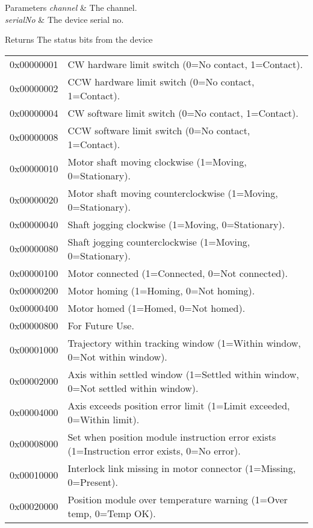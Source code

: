 \begin{DoxyParams}{Parameters}
{\em channel} & The channel. \\
\hline
{\em serial\+No} & The device serial no. \\
\hline
\end{DoxyParams}
\begin{DoxyReturn}{Returns}
The status bits from the device \tabulinesep=1mm
\begin{longtabu} spread 0pt [c]{*2{|X[-1]}|}
\hline
0x00000001&CW hardware limit switch (0=No contact, 1=Contact). \\
0x00000002&C\+CW hardware limit switch (0=No contact, 1=Contact). \\
0x00000004&CW software limit switch (0=No contact, 1=Contact). \\
0x00000008&C\+CW software limit switch (0=No contact, 1=Contact). \\
0x00000010&Motor shaft moving clockwise (1=Moving, 0=Stationary). \\
0x00000020&Motor shaft moving counterclockwise (1=Moving, 0=Stationary). \\
0x00000040&Shaft jogging clockwise (1=Moving, 0=Stationary). \\
0x00000080&Shaft jogging counterclockwise (1=Moving, 0=Stationary). \\
0x00000100&Motor connected (1=Connected, 0=Not connected). \\
0x00000200&Motor homing (1=Homing, 0=Not homing). \\
0x00000400&Motor homed (1=Homed, 0=Not homed). \\
0x00000800&For Future Use. \\
0x00001000&Trajectory within tracking window (1=Within window, 0=Not within window). \\
0x00002000&Axis within settled window (1=Settled within window, 0=Not settled within window). \\
0x00004000&Axis exceeds position error limit (1=Limit exceeded, 0=Within limit). \\
0x00008000&Set when position module instruction error exists (1=Instruction error exists, 0=No error). \\
0x00010000&Interlock link missing in motor connector (1=Missing, 0=Present). \\
0x00020000&Position module over temperature warning (1=Over temp, 0=Temp OK). \\

\end{longtabu}
\end{DoxyReturn}
